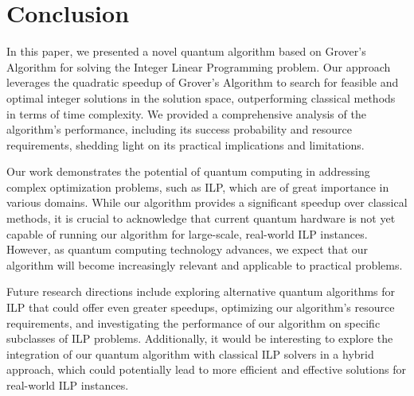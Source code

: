\section{Conclusion} \label{sec:conclusion}

In this paper, we presented a novel quantum algorithm based on Grover's Algorithm for solving the Integer Linear Programming problem. Our approach leverages the quadratic speedup of Grover's Algorithm to search for feasible and optimal integer solutions in the solution space, outperforming classical methods in terms of time complexity. We provided a comprehensive analysis of the algorithm's performance, including its success probability and resource requirements, shedding light on its practical implications and limitations.

Our work demonstrates the potential of quantum computing in addressing complex optimization problems, such as ILP, which are of great importance in various domains. While our algorithm provides a significant speedup over classical methods, it is crucial to acknowledge that current quantum hardware is not yet capable of running our algorithm for large-scale, real-world ILP instances. However, as quantum computing technology advances, we expect that our algorithm will become increasingly relevant and applicable to practical problems.

Future research directions include exploring alternative quantum algorithms for ILP that could offer even greater speedups, optimizing our algorithm's resource requirements, and investigating the performance of our algorithm on specific subclasses of ILP problems. Additionally, it would be interesting to explore the integration of our quantum algorithm with classical ILP solvers in a hybrid approach, which could potentially lead to more efficient and effective solutions for real-world ILP instances.

